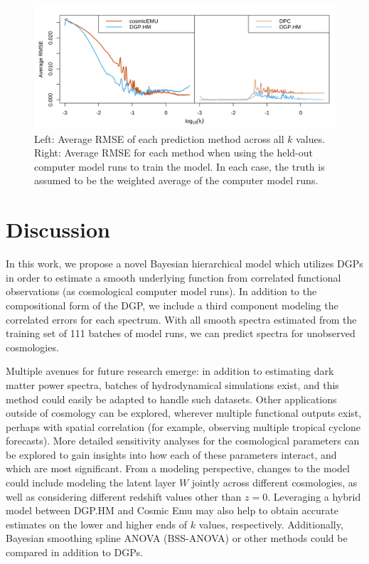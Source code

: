 \documentclass[11pt]{article}
\begin{document}
\begin{figure}[ht]
    \centering
    \includegraphics[width=6in]{rmse_by_k.png}
    \caption{Left: Average RMSE of each prediction method across all $k$ values. Right: Average RMSE for each method when using the held-out computer model runs to train the model. In each case, the truth is assumed to be the weighted average of the computer model runs.}
    \label{fig:plot_rmse_k}
\end{figure}


\section{Discussion}
\label{sec:disc}

In this work, we propose a novel Bayesian hierarchical model which utilizes DGPs in order to estimate a smooth underlying function from correlated functional observations (as cosmological computer model runs). In addition to the compositional form of the DGP, we include a third component modeling the correlated errors for each spectrum. With all smooth spectra estimated from the training set of 111 batches of model runs, we can predict spectra for unobserved cosmologies.

Multiple avenues for future research emerge: in addition to estimating dark matter power spectra, batches of hydrodynamical simulations exist, and this method could easily be adapted to handle such datasets. Other applications outside of cosmology can be explored, wherever multiple functional outputs exist, perhaps with spatial correlation (for example, observing multiple tropical cyclone forecasts). More detailed sensitivity analyses for the cosmological parameters can be explored to gain insights into how each of these parameters interact, and which are most significant. From a modeling perspective, changes to the model could include modeling the latent layer $W$ jointly across different cosmologies, as well as considering different redshift values other than $z=0$. Leveraging a hybrid model between DGP.HM and Cosmic Emu may also help to obtain accurate estimates on the lower and higher ends of $k$ values, respectively. Additionally, Bayesian smoothing spline ANOVA (BSS-ANOVA) or other methods could be compared in addition to DGPs. 
\end{document}
